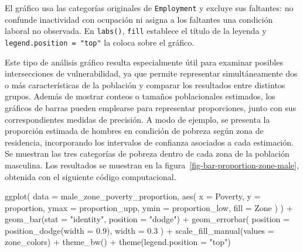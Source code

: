 \documentclass[
  spanish,
  11pt,
  letterpaper,
  oneside,
  open=any]{scrbook}
\newenvironment{Shaded}{\begin{snugshade}}{\end{snugshade}}
\newcommand{\AttributeTok}[1]{\textcolor[rgb]{0.40,0.45,0.13}{#1}}
\newcommand{\FloatTok}[1]{\textcolor[rgb]{0.68,0.00,0.00}{#1}}
\newcommand{\FunctionTok}[1]{\textcolor[rgb]{0.28,0.35,0.67}{#1}}
\newcommand{\NormalTok}[1]{\textcolor[rgb]{0.00,0.23,0.31}{#1}}
\newcommand{\SpecialCharTok}[1]{\textcolor[rgb]{0.37,0.37,0.37}{#1}}
\newcommand{\StringTok}[1]{\textcolor[rgb]{0.13,0.47,0.30}{#1}}
\begin{document}
El gráfico usa las categorías originales de \texttt{Employment} y
excluye sus faltantes: no confunde inactividad con ocupación ni asigna a
los faltantes una condición laboral no observada. En \texttt{labs()},
\texttt{fill} establece el título de la leyenda y
\texttt{legend.position\ =\ "top"} la coloca sobre el gráfico.

Este tipo de análisis gráfico resulta especialmente útil para examinar
posibles intersecciones de vulnerabilidad, ya que permite representar
simultáneamente dos o más características de la población y comparar los
resultados entre distintos grupos. Además de mostrar conteos o tamaños
poblacionales estimados, los gráficos de barras pueden emplearse para
representar proporciones, junto con sus correspondientes medidas de
precisión. A modo de ejemplo, se presenta la proporción estimada de
hombres en condición de pobreza según zona de residencia, incorporando
los intervalos de confianza asociados a cada estimación. Se muestran las
tres categorías de pobreza dentro de cada zona de la población
masculina. Los resultados se muestran en la
figura~\ref{fig-bar-proportion-zone-male}, obtenida con el siguiente
código computacional.

\begin{Shaded}
\begin{Highlighting}[]
\FunctionTok{ggplot}\NormalTok{(}
  \AttributeTok{data =}\NormalTok{ male\_zone\_poverty\_proportion,}
  \FunctionTok{aes}\NormalTok{(}
    \AttributeTok{x =}\NormalTok{ Poverty,}
    \AttributeTok{y =}\NormalTok{ proportion,}
    \AttributeTok{ymax =}\NormalTok{ proportion\_upp,}
    \AttributeTok{ymin =}\NormalTok{ proportion\_low,}
    \AttributeTok{fill =}\NormalTok{ Zone}
\NormalTok{  )}
\NormalTok{) }\SpecialCharTok{+}
  \FunctionTok{geom\_bar}\NormalTok{(}\AttributeTok{stat =} \StringTok{"identity"}\NormalTok{, }\AttributeTok{position =} \StringTok{"dodge"}\NormalTok{) }\SpecialCharTok{+}
  \FunctionTok{geom\_errorbar}\NormalTok{(}
    \AttributeTok{position =} \FunctionTok{position\_dodge}\NormalTok{(}\AttributeTok{width =} \FloatTok{0.9}\NormalTok{),}
    \AttributeTok{width =} \FloatTok{0.3}
\NormalTok{  ) }\SpecialCharTok{+}
  \FunctionTok{scale\_fill\_manual}\NormalTok{(}\AttributeTok{values =}\NormalTok{ zone\_colors) }\SpecialCharTok{+}
  \FunctionTok{theme\_bw}\NormalTok{() }\SpecialCharTok{+}
  \FunctionTok{theme}\NormalTok{(}\AttributeTok{legend.position =} \StringTok{"top"}\NormalTok{)}
\end{Highlighting}
\end{Shaded}
\end{document}
